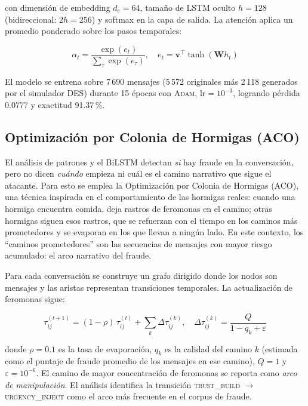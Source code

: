 \documentclass{llncs}
\begin{document}
con dimensión de embedding $d_e=64$, tamaño de LSTM oculto $h=128$
(bidireccional: $2h=256$) y softmax en la capa de salida.
La atención aplica un promedio ponderado sobre los pasos temporales:

\begin{equation}
  \alpha_t = \frac{\exp(e_t)}{\sum_{\tau} \exp(e_\tau)},
  \quad e_t = \mathbf{v}^\top \tanh(\mathbf{W} h_t)
\end{equation}

El modelo se entrena sobre 7\,690 mensajes (5\,572 originales más
2\,118 generados por el simulador DES) durante 15 épocas con
\textsc{Adam}, $\mathrm{lr}=10^{-3}$, logrando pérdida 0.0777 y
exactitud 91.37\,\%.

\subsection{Optimización por Colonia de Hormigas (ACO)}
\label{sec:conv:aco}

El análisis de patrones y el BiLSTM detectan \emph{si} hay fraude
en la conversación, pero no dicen \emph{cuándo} empieza ni cuál
es el camino narrativo que sigue el atacante.
Para esto se emplea la Optimización por Colonia de Hormigas (ACO),
una técnica inspirada en el comportamiento de las hormigas reales:
cuando una hormiga encuentra comida, deja rastros de feromonas
en el camino; otras hormigas siguen esos rastros, que se refuerzan
con el tiempo en los caminos más prometedores y se evaporan en los
que llevan a ningún lado.
En este contexto, los ``caminos prometedores'' son las secuencias
de mensajes con mayor riesgo acumulado: el arco narrativo del fraude.

Para cada conversación se construye un grafo dirigido donde los
nodos son mensajes y las aristas representan transiciones temporales.
La actualización de feromonas sigue:

\begin{equation}
  \tau_{ij}^{(t+1)} = (1-\rho)\,\tau_{ij}^{(t)}
    + \sum_{k} \Delta\tau_{ij}^{(k)},
  \quad \Delta\tau_{ij}^{(k)} = \frac{Q}{1 - q_k + \varepsilon}
  \label{eq:aco}
\end{equation}

donde $\rho=0.1$ es la tasa de evaporación, $q_k$ es la calidad
del camino $k$ (estimada como el puntaje de fraude promedio
de los mensajes en ese camino), $Q=1$ y $\varepsilon=10^{-6}$.
El camino de mayor concentración de feromonas se reporta como
\textit{arco de manipulación}.
El análisis identifica la transición
\textsc{trust\_build} $\to$ \textsc{urgency\_inject}
como el arco más frecuente en el corpus de fraude.
\end{document}
